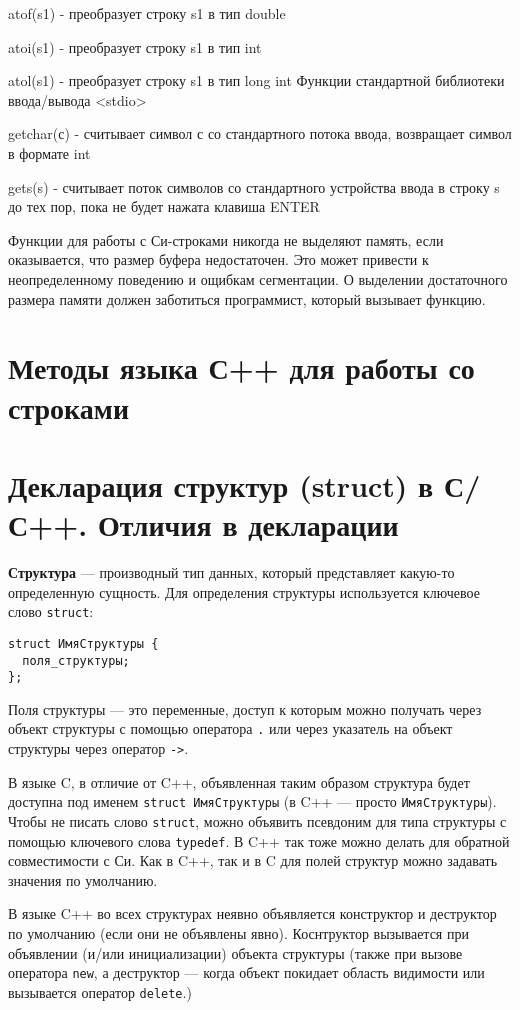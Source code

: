 \documentclass[14pt, a4paper]{extarticle}
\begin{document}
atof(s1) - преобразует строку s1 в тип double

atoi(s1) - преобразует строку s1 в тип int

atol(s1) - преобразует строку s1 в тип long int
Функции стандартной библиотеки ввода/вывода <stdio>

getchar(с) - считывает символ с со стандартного потока ввода, возвращает символ в формате int

gets(s) - считывает поток символов со стандартного устройства ввода в строку s до тех пор, пока не будет нажата клавиша ENTER

\vspace{1cm}

Функции для работы с Си-строками никогда не выделяют память, если оказывается, что размер буфера недостаточен. Это 
может привести к неопределенному поведению и ощибкам сегментации. О выделении
достаточного размера памяти должен заботиться программист, который вызывает функцию.

\section{Методы языка С++ для работы со строками}

\section{Декларация структур (struct) в С/С++. Отличия в декларации}
\textbf{Структура} \label{def:struct} --- производный тип данных, который представляет какую-то определенную сущность.
Для определения структуры используется ключевое слово \verb|struct|:

\begin{verbatim}
struct ИмяСтруктуры {
  поля_структуры;
};
\end{verbatim}
Поля структуры --- это переменные, доступ к которым можно получать через объект структуры
с помощью оператора \verb|.| или через указатель на объект структуры через оператор \verb|->|.

В языке C, в отличие от C++, объявленная таким образом структура будет доступна под именем
\verb|struct ИмяСтруктуры| (в C++ --- просто \verb|ИмяСтруктуры|). Чтобы не писать слово
\verb|struct|, можно объявить псевдоним для типа структуры с помощью ключевого слова
\verb|typedef|. В C++ так тоже можно делать для обратной совместимости с Си. Как в C++, так
и в C для полей структур можно задавать значения по умолчанию.

{\small В языке C++ во всех структурах неявно объявляется конструктор и деструктор по умолчанию
(если они не объявлены явно). Коснтруктор вызывается при объявлении (и/или инициализации) объекта
структуры (также при вызове оператора \verb|new|, а деструктор --- когда объект покидает
область видимости или вызывается оператор \verb|delete|.)}
\end{document}
